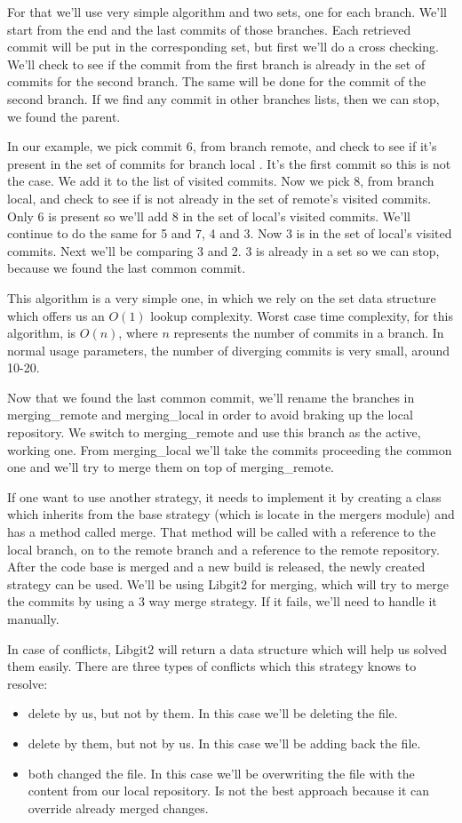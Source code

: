 For that we'll use very simple algorithm and two sets, one for each branch. We'll start from the end and the last commits of those branches. Each retrieved commit will be put in the corresponding set, but first we'll do a cross checking. We'll check to see if the commit from the first branch is already in the set of commits for the second branch. The same will be done for the commit of the second branch. If we find any commit in other branches lists, then we can stop, we found the parent.

In our example, we pick commit 6, from branch remote, and check to see if it's present in the set of commits for branch local . It's the first commit so this is not the case. We add it to the list of visited commits. Now we pick 8, from branch local, and check to see if is not already in the set of remote's  visited commits.
Only 6 is present so we'll add 8 in the set of local's visited commits. We'll continue to do the same for 5 and 7, 4 and 3. Now 3 is in the set of local's visited commits. Next we'll be comparing 3 and 2. 3 is already in a set so we can stop, because we found the last common commit.

This algorithm is a very simple one, in which we rely on the set data structure which offers us an $O(1)$ lookup complexity. Worst case time complexity, for this algorithm, is $O(n)$, where $n$ represents the number of commits in a branch. In normal usage parameters, the number of diverging commits is very small, around 10-20.

Now that we found the last common commit, we'll rename the branches in merging\_remote and merging\_local in order to avoid braking up the local repository. We switch to merging\_remote and use this branch as the active, working one. From merging\_local we'll take the commits proceeding the common one and we'll try to merge them on top of merging\_remote. 

If one want to use another strategy, it needs to implement it by creating a class which inherits from the base strategy (which is locate in the mergers module) and has a method called merge. That method will be called with a reference to the local branch, on to the remote branch and a reference to the remote repository. After the code base is merged and a new build is released, the newly created strategy can be used. We'll be using Libgit2 for merging, which will try to merge the commits by using a 3 way merge strategy. If it fails, we'll need to handle it manually.

In case of conflicts, Libgit2 will return a data structure which will help us solved them easily. There are three types of conflicts which this strategy knows to resolve:
\begin{itemize}
    \item delete by us, but not by them. In this case we'll be deleting the file.
    \item delete by them, but not by us. In this case we'll be adding back the file.
    \item both changed the file. In this case we'll be overwriting the file with the content from our local repository. Is not the best approach because it can override already merged changes.
\end{itemize}

